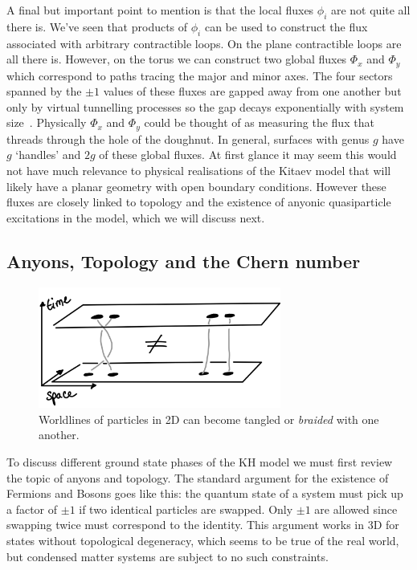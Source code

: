A final but important point to mention is that the local fluxes \(\phi_i\) are not quite all there is. We've seen that products of \(\phi_i\) can be used to construct the flux associated with arbitrary contractible loops. On the plane contractible loops are all there is. However, on the torus we can construct two global fluxes \(\Phi_x\) and \(\Phi_y\) which correspond to paths tracing the major and minor axes. The four sectors spanned by the \(\pm1\) values of these fluxes are gapped away from one another but only by virtual tunnelling processes so the gap decays exponentially with system size~\autocite{kitaevAnyonsExactlySolved2006}. Physically \(\Phi_x\) and \(\Phi_y\) could be thought of as measuring the flux that threads through the hole of the doughnut. In general, surfaces with genus \(g\) have \(g\) `handles' and \(2g\) of these global fluxes. At first glance it may seem this would not have much relevance to physical realisations of the Kitaev model that will likely have a planar geometry with open boundary conditions. However these fluxes are closely linked to topology and the existence of anyonic quasiparticle excitations in the model, which we will discuss next.

\hypertarget{sec:anyons}{%
\subsection{Anyons, Topology and the Chern number}\label{sec:anyons}}

\hypertarget{fig:braiding}{%
\begin{figure}
\centering
\includegraphics[width=0.71\textwidth,height=\textheight]{figure_code/amk_chapter/braiding.png}
\caption[{Braiding in Two Dimensions}]{Worldlines of particles in 2D can become tangled or \emph{braided} with one another.}
\label{fig:braiding}
\end{figure}
}

To discuss different ground state phases of the KH model we must first review the topic of anyons and topology. The standard argument for the existence of Fermions and Bosons goes like this: the quantum state of a system must pick up a factor of \(\pm1\) if two identical particles are swapped. Only \(\pm1\) are allowed since swapping twice must correspond to the identity. This argument works in 3D for states without topological degeneracy, which seems to be true of the real world, but condensed matter systems are subject to no such constraints.


